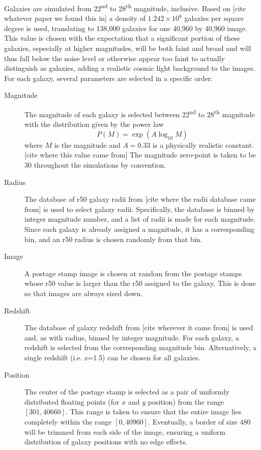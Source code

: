 \documentclass[10pt,twoside]{article}
\theoremstyle{definition}
\theoremstyle{exercise}
\begin{document}
Galaxies are simulated from 22\textsuperscript{nd} to 28\textsuperscript{th} magnitude, inclusive. Based on [cite whatever paper we found this in] a density of $1.242 \times 10^6$ galaxies per square degree is used, translating to 138,000 galaxies for one 40,960 by 40,960 image. This value is chosen with the expectation that a significant portion of these galaxies, especially at higher magnitudes, will be both faint and broad and will thus fall below the noise level or otherwise appear too faint to actually distinguish as galaxies, adding a realistic cosmic light background to the images. For each galaxy, several parameters are selected in a specific order:

\begin{description}
  \item[Magnitude] The magnitude of each galaxy is selected between 22\textsuperscript{nd} to 28\textsuperscript{th} magnitude with the distribution given by the power law
    \begin{equation}
      P(M) = \exp\left( A\log_{10}M \right)
      \label{eq:mag_power_law}
    \end{equation}
    where $M$ is the magnitude and $A = 0.33$ is a physically realistic constant.[cite where this value came from] The magnitude zero-point is taken to be 30 throughout the simulations by convention.

  \item[Radius] The database of r50 galaxy radii from [cite where the radii database came from] is used to select galaxy radii. Specifically, the database is binned by integer magnitude number, and a list of radii is made for each magnitude. Since each galaxy is already assigned a magnitude, it has a corresponding bin, and an r50 radius is chosen randomly from that bin.

  \item[Image] A postage stamp image is chosen at random from the postage stamps whose r50 value is larger than the r50 assigned to the galaxy. This is done so that images are always sized down.

  \item[Redshift] The database of galaxy redshift from [cite wherever it came from] is used and, as with radius, binned by integer magnitude. For each galaxy, a redshift is selected from the corresponding magnitude bin. Alternatively, a single redshift (i.e. z=1.5) can be chosen for all galaxies.

  \item[Position] The center of the postage stamp is selected as a pair of uniformly distributed floating points (for $x$ and $y$ position) from the range $[301, 40660]$. This range is taken to ensure that the entire image lies completely within the range $[0,40960]$. Eventually, a border of size $480$ will be trimmed from each side of the image, ensuring a uniform distribution of galaxy positions with no edge effects.


\end{description}
\end{document}
